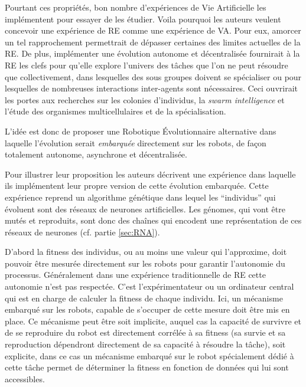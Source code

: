 Pourtant ces propriétés, bon nombre d'expériences de Vie Artificielle les implémentent pour essayer de les étudier. Voila pourquoi les auteurs veulent concevoir une expérience de RE comme une expérience de VA. Pour eux, amorcer un tel rapprochement permettrait de dépasser certaines des limites actuelles de la RE. De plus, implémenter une évolution autonome et décentralisée fournirait à la RE les clefs pour qu'elle explore l'univers des tâches que l'on ne peut résoudre que collectivement, dans lesquelles des sous groupes doivent se spécialiser ou pour lesquelles de nombreuses interactions inter-agents sont nécessaires. Ceci ouvrirait les portes aux recherches sur les colonies d'individus, la \emph{swarm intelligence} \citep{garnier2007biologicalprincipeswarmintelligence} et l'étude des organismes multicellulaires et de la spécialisation.

L'idée est donc de proposer une Robotique \'Evolutionnaire alternative dans laquelle l'évolution serait \emph{embarquée} directement sur les robots, de façon totalement autonome, asynchrone et décentralisée.

Pour illustrer leur proposition les auteurs décrivent une expérience dans laquelle ils implémentent leur propre version de cette évolution embarquée. Cette expérience reprend un algorithme génétique dans lequel les ``individus'' qui évoluent sont des réseaux de neurones artificielles. Les génomes, qui vont être mutés et reproduits, sont donc des chaînes qui encodent une représentation de ces réseaux de neurones (cf. partie \ref{sec:RNA}).

D'abord la fitness des individus, ou au moins une valeur qui l'approxime, doit pouvoir être mesurée directement sur les robots pour garantir l'autonomie du processus. Généralement dans une expérience traditionnelle de RE cette autonomie n'est pas respectée. C'est l'expérimentateur ou un ordinateur central qui est en charge de calculer la fitness de chaque individu. Ici, un mécanisme embarqué sur les robots, capable de s'occuper de cette mesure doit être mis en place. Ce mécanisme peut être soit implicite, auquel cas la capacité de survivre et de se reproduire du robot est directement corrélée à sa fitness (sa survie et sa reproduction dépendront directement de sa capacité à résoudre la tâche), soit explicite, dans ce cas un mécanisme embarqué sur le robot spécialement dédié à cette tâche permet de déterminer la fitness en fonction de données qui lui sont accessibles.

